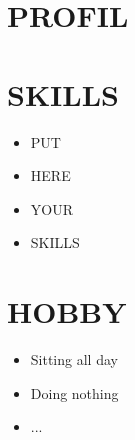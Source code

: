 \documentclass[a4paper, 11pt, a4paper, oneside, titlepage]{article}
\begin{document}
\hfill
\begin{minipage}[t]{0.35\textwidth}
    \section*{PROFIL}

    \lipsum[2][1-5]

    \section*{SKILLS}

    \begin{itemize}[leftmargin=*, itemsep=4pt]
        \item PUT
        \item HERE
        \item YOUR
        \item SKILLS
    \end{itemize}

    \section*{HOBBY}

    \begin{itemize}[leftmargin=*, itemsep=4pt]
        \item Sitting all day
        \item Doing nothing
        \item ...
    \end{itemize}
    
\end{minipage}
\end{document}
